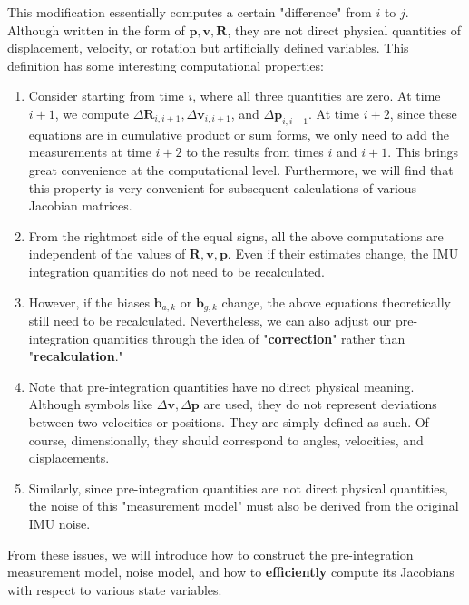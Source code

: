 This modification essentially computes a certain "difference" from $i$ to $j$. Although written in the form of $\bm{p}, \bm{v}, \bm{R}$, they are not direct physical quantities of displacement, velocity, or rotation but artificially defined variables. This definition has some interesting computational properties:
\begin{enumerate}
	\item Consider starting from time $i$, where all three quantities are zero. At time $i+1$, we compute $\Delta \bm{R}_{i, i+1}, \Delta \bm{v}_{i, i+1}$, and $\Delta \bm{p}_{i,i+1}$. At time $i+2$, since these equations are in cumulative product or sum forms, we only need to add the measurements at time $i+2$ to the results from times $i$ and $i+1$. This brings great convenience at the computational level. Furthermore, we will find that this property is very convenient for subsequent calculations of various Jacobian matrices.
	\item From the rightmost side of the equal signs, all the above computations are independent of the values of $\bm{R}, \bm{v}, \bm{p}$. Even if their estimates change, the IMU integration quantities do not need to be recalculated.
	\item However, if the biases $\bm{b}_{a,k}$ or $\bm{b}_{g,k}$ change, the above equations theoretically still need to be recalculated. Nevertheless, we can also adjust our pre-integration quantities through the idea of "\textbf{correction}" rather than "\textbf{recalculation}."
	\item Note that pre-integration quantities have no direct physical meaning. Although symbols like $\Delta \bm{v}, \Delta \bm{p}$ are used, they do not represent deviations between two velocities or positions. They are simply defined as such. Of course, dimensionally, they should correspond to angles, velocities, and displacements.
	\item Similarly, since pre-integration quantities are not direct physical quantities, the noise of this "measurement model" must also be derived from the original IMU noise.
\end{enumerate}

From these issues, we will introduce how to construct the pre-integration measurement model, noise model, and how to \textbf{efficiently} compute its Jacobians with respect to various state variables.

